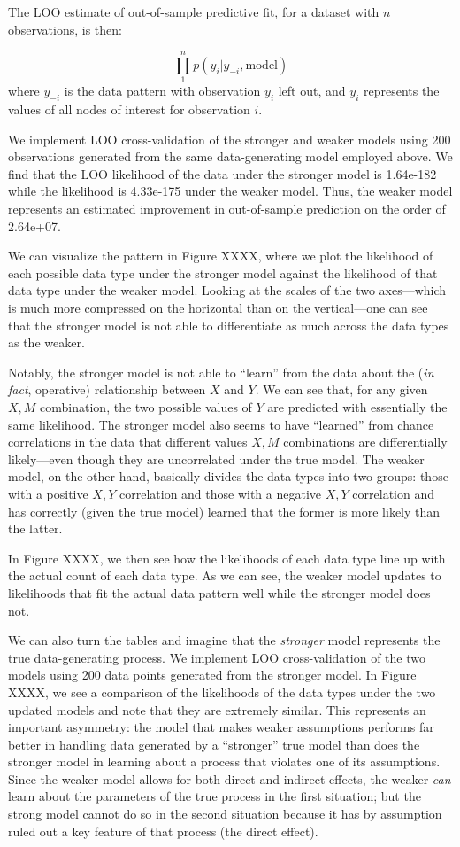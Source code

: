 \documentclass[
  12pt,
]{book}
\begin{document}
The LOO estimate of out-of-sample predictive fit, for a dataset with \(n\) observations, is then:

\[\prod_1^np(y_i|y_{-i}, \text{model})\]
where \(y_{-i}\) is the data pattern with observation \(y_i\) left out, and \(y_i\) represents the values of all nodes of interest for observation \(i\).

We implement LOO cross-validation of the stronger and weaker models using 200 observations generated from the same data-generating model employed above. We find that the LOO likelihood of the data under the stronger model is 1.64e-182 while
the likelihood is 4.33e-175 under the weaker model. Thus, the weaker model represents an estimated improvement in out-of-sample prediction on the order of 2.64e+07.

We can visualize the pattern in Figure XXXX, where we plot the likelihood of each possible data type under the stronger model against the likelihood of that data type under the weaker model. Looking at the scales of the two axes---which is much more compressed on the horizontal than on the vertical---one can see that the stronger model is not able to differentiate as much across the data types as the weaker.

Notably, the stronger model is not able to ``learn'' from the data about the (\emph{in fact}, operative) relationship between \(X\) and \(Y\). We can see that, for any given \(X, M\) combination, the two possible values of \(Y\) are predicted with essentially the same likelihood. The stronger model also seems to have ``learned'' from chance correlations in the data that different values \(X,M\) combinations are differentially likely---even though they are uncorrelated under the true model. The weaker model, on the other hand, basically divides the data types into two groups: those with a positive \(X,Y\) correlation and those with a negative \(X,Y\) correlation and has correctly (given the true model) learned that the former is more likely than the latter.

In Figure XXXX, we then see how the likelihoods of each data type line up with the actual count of each data type. As we can see, the weaker model updates to likelihoods that fit the actual data pattern well while the stronger model does not.

We can also turn the tables and imagine that the \emph{stronger} model represents the true data-generating process. We implement LOO cross-validation of the two models using 200 data points generated from the stronger model. In Figure XXXX, we see a comparison of the likelihoods of the data types under the two updated models and note that they are extremely similar. This represents an important asymmetry: the model that makes weaker assumptions performs far better in handling data generated by a ``stronger'' true model than does the stronger model in learning about a process that violates one of its assumptions. Since the weaker model allows for both direct and indirect effects, the weaker \emph{can} learn about the parameters of the true process in the first situation; but the strong model cannot do so in the second situation because it has by assumption ruled out a key feature of that process (the direct effect).
\end{document}
